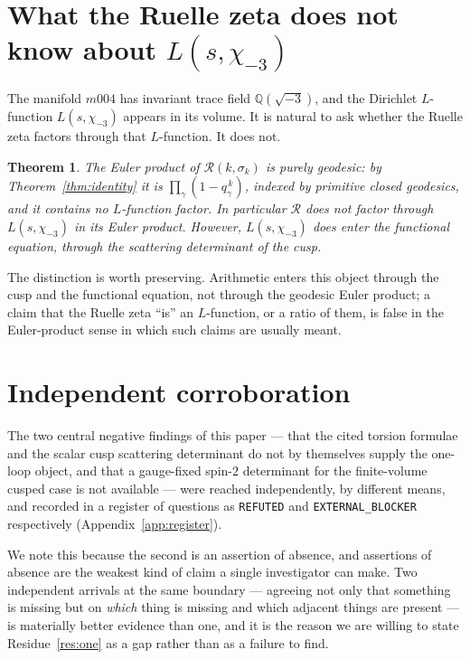 \documentclass[11pt,a4paper]{article}
\newtheorem{theorem}{Theorem}[section]
\theoremstyle{definition}
\theoremstyle{remark}
\newcommand{\Q}{\mathbb{Q}}
\newcommand{\Rz}{\mathcal{R}}
\begin{document}
\section{What the Ruelle zeta does not know about $L(s,\chi_{-3})$}\label{sec:Lchi}

The manifold $m004$ has invariant trace field $\Q(\sqrt{-3})$, and the Dirichlet $L$-function
$L(s,\chi_{-3})$ appears in its volume. It is natural to ask whether the Ruelle zeta factors
through that $L$-function. It does not.

\begin{theorem}\label{thm:Lchi}
The Euler product of $\Rz(k,\sigma_k)$ is purely geodesic: by Theorem~\ref{thm:identity} it is
$\prod_\gamma(1-q_\gamma^{\,k})$, indexed by primitive closed geodesics, and it contains no
$L$-function factor. In particular $\Rz$ does not factor through $L(s,\chi_{-3})$ in its Euler
product. However, $L(s,\chi_{-3})$ \emph{does} enter the functional equation, through the
scattering determinant of the cusp.
\end{theorem}

The distinction is worth preserving. Arithmetic enters this object through the cusp and the
functional equation, not through the geodesic Euler product; a claim that the Ruelle zeta ``is''
an $L$-function, or a ratio of them, is false in the Euler-product sense in which such claims
are usually meant.

\section{Independent corroboration}\label{sec:corrob}

The two central negative findings of this paper --- that the cited torsion formulae and the
scalar cusp scattering determinant do not by themselves supply the one-loop object, and that a
gauge-fixed spin-$2$ determinant for the finite-volume cusped case is not available --- were
reached independently, by different means, and recorded in a register of questions as
\texttt{REFUTED} and \texttt{EXTERNAL\_BLOCKER} respectively (Appendix~\ref{app:register}).

We note this because the second is an assertion of absence, and assertions of absence are the
weakest kind of claim a single investigator can make. Two independent arrivals at the same
boundary --- agreeing not only that something is missing but on \emph{which} thing is missing and
which adjacent things are present --- is materially better evidence than one, and it is the
reason we are willing to state Residue~\ref{res:one} as a gap rather than as a failure to find.
\end{document}
